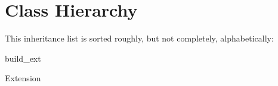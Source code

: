 \section{Class Hierarchy}
This inheritance list is sorted roughly, but not completely, alphabetically\+:\begin{DoxyCompactList}
\item build\+\_\+ext\begin{DoxyCompactList}
\item {}
\end{DoxyCompactList}
\item Extension\begin{DoxyCompactList}
\item {}
\end{DoxyCompactList}
\end{DoxyCompactList}
